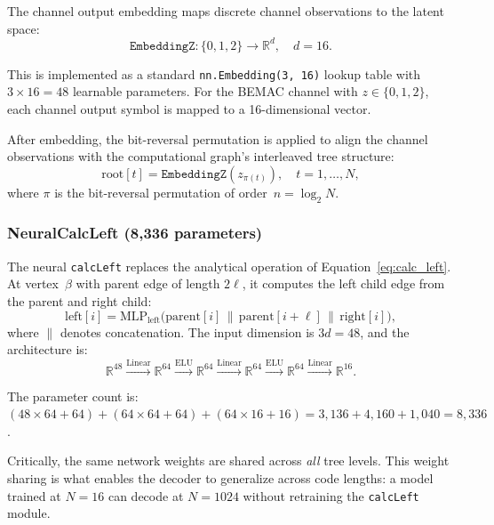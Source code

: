 \documentclass[11pt,a4paper]{article}
\newcommand{\R}{\mathbb{R}}
\begin{document}
The channel output embedding maps discrete channel observations to the latent space:
\begin{equation}
    \texttt{EmbeddingZ}: \{0, 1, 2\} \to \R^d, \quad d = 16.
\end{equation}

This is implemented as a standard \texttt{nn.Embedding(3, 16)} lookup table with $3 \times 16 = 48$ learnable parameters. For the BEMAC channel with $z \in \{0, 1, 2\}$, each channel output symbol is mapped to a 16-dimensional vector.

After embedding, the bit-reversal permutation is applied to align the channel observations with the computational graph's interleaved tree structure:
\begin{equation}
    \text{root}[t] = \texttt{EmbeddingZ}(z_{\pi(t)}), \quad t = 1, \ldots, N,
\end{equation}
where $\pi$ is the bit-reversal permutation of order~$n = \log_2 N$.

\subsubsection{NeuralCalcLeft (8,336 parameters)}

The neural \texttt{calcLeft} replaces the analytical operation of Equation~\eqref{eq:calc_left}. At vertex~$\beta$ with parent edge of length $2\ell$, it computes the left child edge from the parent and right child:
\begin{equation}
    \text{left}[i] = \text{MLP}_{\text{left}}\bigl(\text{parent}[i] \,\|\, \text{parent}[i + \ell] \,\|\, \text{right}[i]\bigr),
\end{equation}
where $\|$ denotes concatenation. The input dimension is $3d = 48$, and the architecture is:
\begin{equation}
    \R^{48} \xrightarrow{\text{Linear}} \R^{64} \xrightarrow{\text{ELU}} \R^{64} \xrightarrow{\text{Linear}} \R^{64} \xrightarrow{\text{ELU}} \R^{64} \xrightarrow{\text{Linear}} \R^{16}.
\end{equation}

The parameter count is: $(48 \times 64 + 64) + (64 \times 64 + 64) + (64 \times 16 + 16) = 3{,}136 + 4{,}160 + 1{,}040 = 8{,}336$.

Critically, the same network weights are shared across \emph{all} tree levels. This weight sharing is what enables the decoder to generalize across code lengths: a model trained at $N = 16$ can decode at $N = 1024$ without retraining the \texttt{calcLeft} module.
\end{document}
